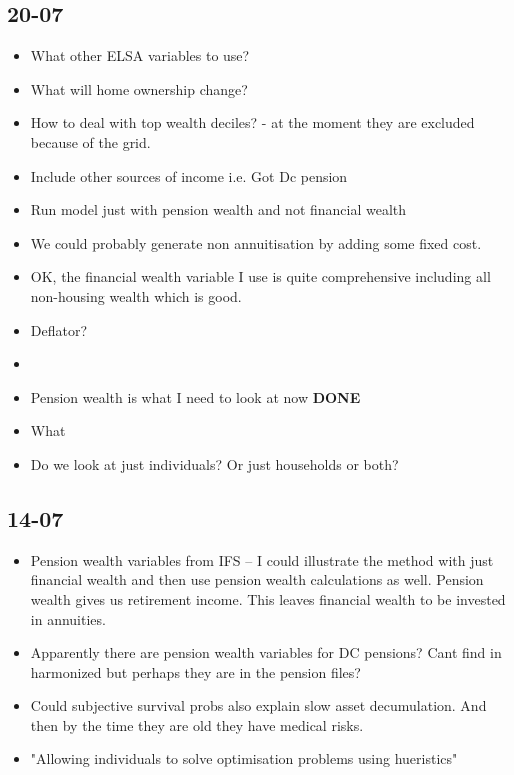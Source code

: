 \documentclass[12pt]{article}
\begin{document}
\subsection{\textbf{20-07}}
\begin{itemize}
    \item What other ELSA variables to use?
    \item What will home ownership change?
    \item How to deal with top wealth deciles? - at the moment they are excluded because of the grid.
    \item Include other sources of income i.e. Got Dc pension
    \item Run model just with pension wealth and not financial wealth
    \item We could probably generate non annuitisation by adding some fixed cost.
    \item OK, the financial wealth variable I use is quite comprehensive including all non-housing
          wealth which is good.
    \item Deflator?
    \item

    \item Pension wealth is what I need to look at now \textbf{DONE}
    \item What
    \item Do we look at just individuals? Or just households or both?
\end{itemize}

\subsection{\textbf{14-07}}
\begin{itemize}
    \item Pension wealth variables from IFS -- I could illustrate
          the method with just financial wealth and then use pension wealth calculations
          as well. Pension wealth gives us retirement income. This leaves financial wealth to be
          invested in annuities.

    \item Apparently there are pension wealth variables for DC pensions?
          Cant find in harmonized but perhaps they are in the pension files?

    \item Could subjective survival probs also explain slow asset decumulation. And then by the time they are old
          they have medical risks.

    \item "Allowing individuals to solve optimisation problems using hueristics"
\end{itemize}
\end{document}
